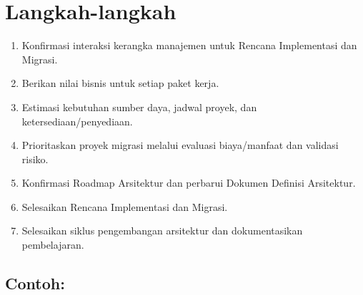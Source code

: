 \section{Langkah-langkah}
\begin{enumerate}
	\item Konfirmasi interaksi kerangka manajemen untuk Rencana Implementasi dan Migrasi.
	\item Berikan nilai bisnis untuk setiap paket kerja.
	\item Estimasi kebutuhan sumber daya, jadwal proyek, dan ketersediaan/penyediaan.
	\item Prioritaskan proyek migrasi melalui evaluasi biaya/manfaat dan validasi risiko.
	\item Konfirmasi Roadmap Arsitektur dan perbarui Dokumen Definisi Arsitektur.
	\item Selesaikan Rencana Implementasi dan Migrasi.
	\item Selesaikan siklus pengembangan arsitektur dan dokumentasikan pembelajaran.
\end{enumerate}

\subsection*{Contoh:}


